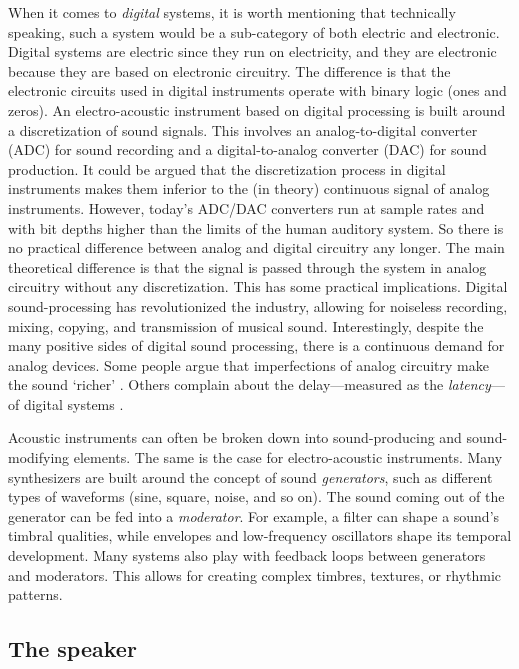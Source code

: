 When it comes to \emph{digital} systems, it is worth mentioning that technically speaking, such a system would be a sub-category of both electric and electronic. Digital systems are electric since they run on electricity, and they are electronic because they are based on electronic circuitry. The difference is that the electronic circuits used in digital instruments operate with binary logic (ones and zeros). An electro-acoustic instrument based on digital processing is built around a discretization of sound signals. This involves an analog-to-digital converter (ADC) for sound recording and a digital-to-analog converter (DAC) for sound production. It could be argued that the discretization process in digital instruments makes them inferior to the (in theory) continuous signal of analog instruments. However, today's ADC/DAC converters run at sample rates and with bit depths higher than the limits of the human auditory system. So there is no practical difference between analog and digital circuitry any longer. The main theoretical difference is that the signal is passed through the system in analog circuitry without any discretization. This has some practical implications. Digital sound-processing has revolutionized the industry, allowing for noiseless recording, mixing, copying, and transmission of musical sound. Interestingly, despite the many positive sides of digital sound processing, there is a continuous demand for analog devices. Some people argue that imperfections of analog circuitry make the sound `richer' \citep{jenkins_analog_2007}. Others complain about the delay---measured as the \emph{latency}---of digital systems \citep{jota_how_2013}.

Acoustic instruments can often be broken down into sound-producing and sound-modifying elements. The same is the case for electro-acoustic instruments. Many synthesizers are built around the concept of sound \emph{generators}, such as different types of waveforms (sine, square, noise, and so on). The sound coming out of the generator can be fed into a \emph{moderator}. For example, a filter can shape a sound's timbral qualities, while envelopes and low-frequency oscillators shape its temporal development. Many systems also play with feedback loops between generators and moderators. This allows for creating complex timbres, textures, or rhythmic patterns.


\subsection{The speaker}

